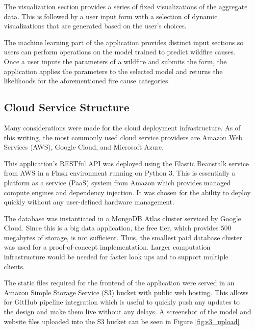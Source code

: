 \documentclass[conference]{IEEEtran}
\begin{document}
The visualization section provides a series of fixed visualizations of the aggregate data. This is followed by a user input form with a selection of dynamic visualizations that are generated based on the user's choices. \par

The machine learning part of the application provides distinct input sections so users can perform operations on the model trained to predict wildfire causes. Once a user inputs the parameters of a wildfire and submits the form, the application applies the parameters to the selected model and returns the likelihoods for the aforementioned fire cause categories. \par

\subsection{Cloud Service Structure}
Many considerations were made for the cloud deployment infrastructure. As of this writing, the most commonly used cloud service providers are Amazon Web Services (AWS), Google Cloud, and Microsoft Azure. \par

This application's RESTful API was deployed using the Elastic Beanstalk service from AWS in a Flask environment running on Python 3. This is essentially a platform as a service (PaaS) system from Amazon which provides managed compute engines and dependency injection. It was chosen for the ability to deploy quickly without any user-defined hardware management. \par

The database was instantiated in a MongoDB Atlas cluster serviced by Google Cloud. Since this is a big data application, the free tier, which provides 500 megabytes of storage, is not sufficient. Thus, the smallest paid database cluster was used for a proof-of-concept implementation. Larger computation infrastructure would be needed for faster look ups and to support multiple clients. \par

The static files required for the frontend of the application were served in an Amazon Simple Storage Service (S3) bucket with public web hosting. This allows for GitHub pipeline integration which is useful to quickly push any updates to the design and make them live without any delays. A screenshot of the model and website files uploaded into the S3 bucket can be seen in Figure \ref{fig:s3_upload} \par
\end{document}
